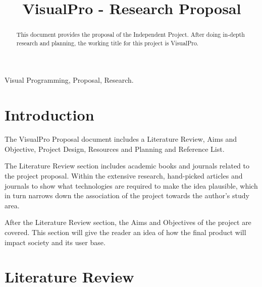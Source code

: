 \documentclass[conference]{IEEEtran}
\begin{document}
	\title{VisualPro - Research Proposal}

	\author{
	}

     \maketitle
    
    \thispagestyle{plain}
    \pagestyle{plain}
    
    \tableofcontents
	  \vspace{.5cm}
	
    \begin{abstract}
      This document provides the proposal of the Independent Project. After doing in-depth research and planning, the working title for this project is VisualPro.
    \end{abstract}

    \begin{IEEEkeywords}
        Visual Programming, Proposal, Research.
    \end{IEEEkeywords}
  
    \section{Introduction}
      The VisualPro Proposal document includes a Literature Review, Aims and Objective, Project Design, Resources and Planning and Reference List.

      The Literature Review section includes academic books and journals related to the project proposal. Within the extensive research, hand-picked articles and journals to show what technologies are required to make the idea plausible, which in turn narrows down the association of the project towards the author's study area.
      
      After the Literature Review section, the Aims and Objectives of the project are covered. This section will give the reader an idea of how the final product will impact society and its user base.
    \section{Literature Review}
\end{document}
